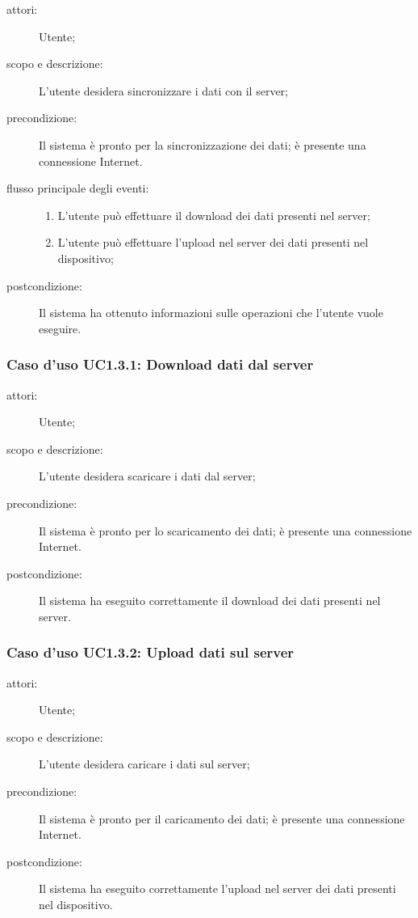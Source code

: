 \begin{description}
\item[attori:] Utente;
\item[scopo e descrizione:] L'utente desidera sincronizzare i dati con il server;
\item[precondizione:] Il sistema è pronto per la sincronizzazione dei dati; è presente una connessione Internet.
\item[flusso principale degli eventi:] \hfill 
	\begin{enumerate}
	\item L'utente può effettuare il download dei dati presenti nel server;
	\item L'utente può effettuare l'upload nel server dei dati presenti nel dispositivo;
	\end{enumerate}
\item[postcondizione:] Il sistema ha ottenuto informazioni sulle operazioni che l'utente vuole eseguire.
\end{description}

\subsubsection{Caso d'uso UC1.3.1: Download dati dal server}
\begin{description}
\item[attori:] Utente;
\item[scopo e descrizione:] L'utente desidera scaricare i dati dal server;
\item[precondizione:] Il sistema è pronto per lo scaricamento dei dati; è presente una connessione Internet.
\item[postcondizione:] Il sistema ha eseguito correttamente il download dei dati presenti nel server.
\end{description}

\subsubsection{Caso d'uso UC1.3.2: Upload dati sul server}
\begin{description}
\item[attori:] Utente;
\item[scopo e descrizione:] L'utente desidera caricare i dati sul server;
\item[precondizione:] Il sistema è pronto per il caricamento dei dati; è presente una connessione Internet.
\item[postcondizione:] Il sistema ha eseguito correttamente l'upload nel server dei dati presenti nel dispositivo.
\end{description}

